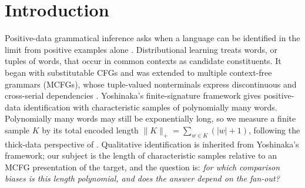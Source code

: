 \section{Introduction}
\label{sec:introduction}

Positive-data grammatical inference asks when a language can be identified
in the limit from positive examples alone \cite{Gold1967,Angluin1980}.
Distributional learning treats words, or tuples of words, that occur in
common contexts as candidate constituents.  It began with substitutable
CFGs \cite{ClarkEyraud2007,Yoshinaka2008} and was extended to multiple
context-free grammars (MCFGs), whose tuple-valued nonterminals express
discontinuous and cross-serial dependencies
\cite{SekiEtAl1991,Yoshinaka2009,Yoshinaka2011,Kallmeyer2010}.
Yoshinaka's finite-signature framework \cite{Yoshinaka2015General} gives
positive-data identification with characteristic samples of polynomially
many words.  Polynomially many words may still be exponentially long, so we
measure a finite sample $K$ by its total encoded length
$\|K\|_+=\sum_{w\in K}(|w|+1)$, following the thick-data perspective of
\cite[Section~2.5.2]{EyraudHeinzYoshinaka2016}.  Qualitative identification
is inherited from Yoshinaka's framework; our subject is the length of
characteristic samples relative to an MCFG presentation of the target, and the
question is: \emph{for which comparison biases is this length polynomial, and
does the answer depend on the fan-out?}

